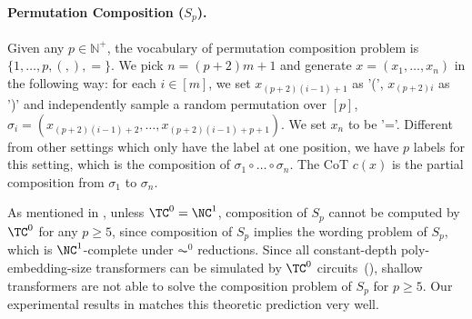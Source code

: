 %
%


	
\paragraph{Permutation Composition ($S_p$).} Given any $p\in\mathbb{N}^+$, the vocabulary of permutation composition problem is $\{1,\ldots,p, (, ), =\}$. We pick $n = (p+2)m+1$ and generate $x=(x_1,\ldots, x_n)$ in the following way: for each $i\in[m]$, we set $x_{(p+2)(i-1)+1}$ as '(', $x_{(p+2)i}$ as ')' and independently sample a random permutation over $[p]$, $\sigma_i = (x_{(p+2)(i-1)+2},\ldots, x_{(p+2)(i-1)+p+1})$. We set $x_n $ to be '='. Different from other settings which only have the label at one position, we have $p$ labels for this setting, which is the composition of $\sigma_1\circ\ldots\circ\sigma_n$. The CoT $c(x)$ is  the partial composition from $\sigma_1$ to $\sigma_n$.

%
%


As mentioned in , unless $\TC^0 = \NC^1$,  composition of $S_p$ cannot be computed by $\TC^0$ for any $p\ge 5$, since composition of $S_p$ implies the wording problem of $S_p$, which is $\NC^1$-complete under $\AC^0$ reductions. Since all constant-depth poly-embedding-size transformers can be simulated by $\TC^0$ circuits~(), shallow transformers are not able to solve the composition problem of $S_p$ for $p\ge 5$. Our experimental results in  matches this theoretic prediction very well. 


